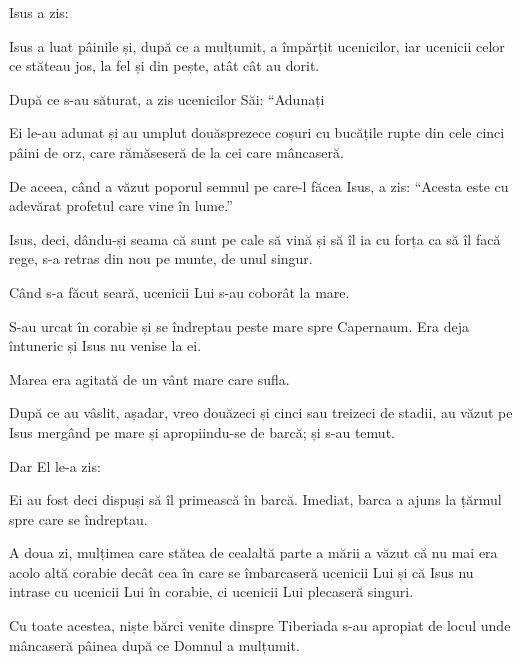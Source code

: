 {\par }{\PP {}Isus a zis:
{}

Isus a luat pâinile și, după ce a mulțumit, a împărțit ucenicilor, iar ucenicii celor ce stăteau jos, la fel și din pește, atât cât au dorit.

După ce s-au săturat, a zis ucenicilor Săi: “Adunați
{}

Ei le-au adunat și au umplut douăsprezece coșuri cu bucățile rupte din cele cinci pâini de orz, care rămăseseră de la cei care mâncaseră.

De aceea, când a văzut poporul semnul pe care-l făcea Isus, a zis: “Acesta este cu adevărat profetul care vine în lume.”

Isus, deci, dându-și seama că sunt pe cale să vină și să îl ia cu forța ca să îl facă rege, s-a retras din nou pe munte, de unul singur.


\par }{\PP {}Când s-a făcut seară, ucenicii Lui s-au coborât la mare.

S-au urcat în corabie și se îndreptau peste mare spre Capernaum. Era deja întuneric și Isus nu venise la ei.

Marea era agitată de un vânt mare care sufla.

După ce au vâslit, așadar, vreo douăzeci și cinci sau treizeci de stadii, au văzut pe Isus mergând pe mare și apropiindu-se de barcă; și s-au temut.

Dar El le-a zis:
{}
{}

Ei au fost deci dispuși să îl primească în barcă. Imediat, barca a ajuns la țărmul spre care se îndreptau.


\par }{\PP {}A doua zi, mulțimea care stătea de cealaltă parte a mării a văzut că nu mai era acolo altă corabie decât cea în care se îmbarcaseră ucenicii Lui și că Isus nu intrase cu ucenicii Lui în corabie, ci ucenicii Lui plecaseră singuri.

Cu toate acestea, niște bărci venite dinspre Tiberiada s-au apropiat de locul unde mâncaseră pâinea după ce Domnul a mulțumit.

}
